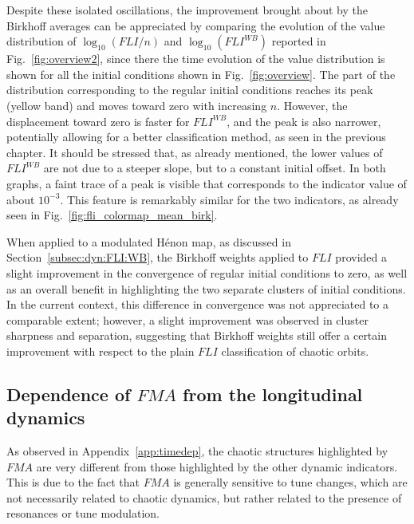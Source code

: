 Despite these isolated oscillations, the improvement brought about by the Birkhoff averages can be appreciated by comparing the evolution of the value distribution of $\log_{10}(FLI/n)$ and $\log_{10}(FLI^{WB})$ reported in Fig.~\ref{fig:overview2}, since there the time evolution of the value distribution is shown for all the initial conditions shown in Fig.~\ref{fig:overview}. The part of the distribution corresponding to the regular initial conditions reaches its peak (yellow band) and moves toward zero with increasing $n$. However, the displacement toward zero is faster for $FLI^{WB}$, and the peak is also narrower, potentially allowing for a better classification method, as seen in the previous chapter. It should be stressed that, as already mentioned, the lower values of $FLI^{WB}$ are not due to a steeper slope, but to a constant initial offset. In both graphs, a faint trace of a peak is visible that corresponds to the indicator value of about $10^{-3}$. This feature is remarkably similar for the two indicators, as already seen in Fig.~\ref{fig:fli_colormap_mean_birk}.

When applied to a modulated Hénon map, as discussed in Section~\ref{subsec:dyn:FLI:WB}, the Birkhoff weights applied to $FLI$ provided a slight improvement in the convergence of regular initial conditions to zero, as well as an overall benefit in highlighting the two separate clusters of initial conditions. In the current context, this difference in convergence was not appreciated to a comparable extent; however, a slight improvement was observed in cluster sharpness and separation, suggesting that Birkhoff weights still offer a certain improvement with respect to the plain $FLI$ classification of chaotic orbits. 

\subsection{Dependence of $FMA$ from the longitudinal dynamics}

As observed in Appendix~\ref{app:timedep}, the chaotic structures highlighted by $FMA$ are very different from those highlighted by the other dynamic indicators. This is due to the fact that $FMA$ is generally sensitive to tune changes, which are not necessarily related to chaotic dynamics, but rather related to the presence of resonances or tune modulation.

